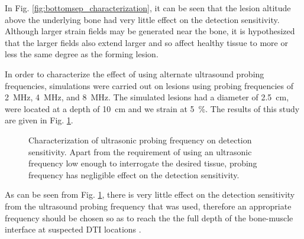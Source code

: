 			In Fig. \ref{fig:bottomsep_characterization}, it can be seen that the lesion altitude above the underlying bone had very little effect on the detection sensitivity. Although larger strain fields may be generated near the bone, it is hypothesized that the larger fields also extend larger and so affect healthy tissue to more or less the same degree as the forming lesion.

			In order to characterize the effect of using alternate ultrasound probing frequencies, simulations were carried out on lesions using probing frequencies of \SI{2}{MHz}, \SI{4}{MHz}, and \SI{8}{MHz}. The simulated lesions had a diameter of \SI{2.5}{cm}, were located at a depth of \SI{10}{cm} and we strain at \SI{5}{\percent}. The results of this study are given in Fig. \ref{fig:freq_characterization}.

			\begin{figure}[!t]
				\centering
				\caption[Ultrasonic probing frequency characterization]{Characterization of ultrasonic probing frequency on detection sensitivity. Apart from the requirement of using an ultrasonic frequency low enough to interrogate the desired tissue, probing frequency has negligible effect on the detection sensitivity.}
				\label{fig:freq_characterization}
			\end{figure}

			As can be seen from Fig. \ref{fig:freq_characterization}, there is very little effect on the detection sensitivity from the ultrasound probing frequency that was used, therefore an appropriate frequency should be chosen so as to reach the the full depth of the bone-muscle interface at suspected DTI locations .

